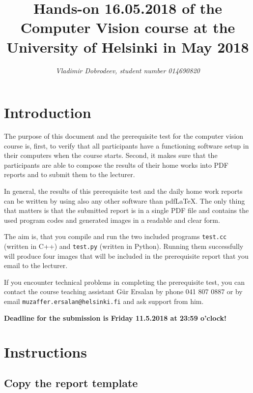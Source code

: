 \documentclass{article}
\begin{document}
\title{Hands-on 16.05.2018 of the Computer Vision course at the
  University of Helsinki in May 2018}

\author{\emph{Vladimir Dobrodeev, student number 014690820}}
\maketitle

\newpage

\section{Introduction}

The purpose of this document and the prerequisite test for the
computer vision course is, first, to verify that all participants have
a functioning software setup in their computers when the course
starts.  Second, it makes sure that the participants are able to
compose the results of their home works into PDF reports and to submit
them to the lecturer.

In general, the results of this prerequisite test and the daily home
work reports can be written by using also any other software than
pdf\LaTeX{}.  The only thing that matters is that the submitted report
is in a single PDF file and contains the used program codes and
generated images in a readable and clear form.

The aim is, that you compile and run the two included programs
\texttt{test.cc} (written in C++) and \texttt{test.py} (written in
Python).  Running them successfully will produce four images that will
be included in the prerequisite report that you email to the lecturer.
 
If you encounter technical problems in completing the prerequisite
test, you can contact the course teaching assistant Gür Ersalan by
phone 041 807 0887 or by email \texttt{muzaffer.ersalan@helsinki.fi}
and ask support from him.

\textbf{Deadline for the submission is Friday 11.5.2018 at 23:59 o'clock!}

\section{Instructions}
\label{sec:running}

\subsection{Copy the report template}
\end{document}
